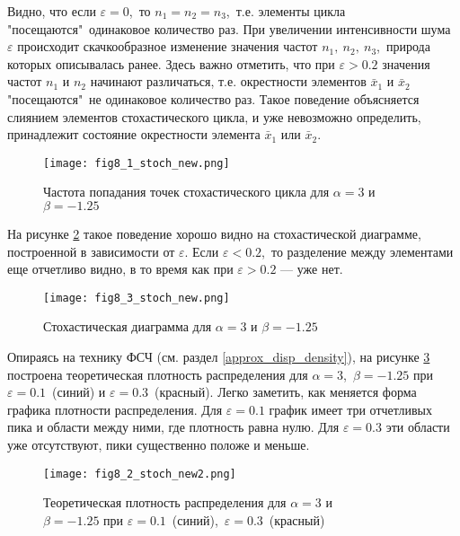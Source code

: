 \documentclass[a4paper, 14pt]{extreport}
\numberwithin{equation}{section}
\numberwithin{figure}{section}
\numberwithin{table}{section}
\begin{document}
                Видно, что если $ \varepsilon = 0 $,~то $ n_{1} = n_{2} = n_{3} $,~т.е. элементы цикла "посещаются"\ одинаковое количество раз. При увеличении интенсивности шума $ \varepsilon $ происходит скачкообразное изменение значения частот $ n_{1},~n_{2},~n_{3} $,~природа которых описывалась ранее. Здесь важно отметить, что при $ \varepsilon > 0.2 $ значения частот $ n_{1} $ и $ n_{2} $ начинают различаться, т.е. окрестности элементов $ \bar{x}_{1} $ и $ \bar{x}_{2} $ "посещаются"\ не одинаковое количество раз. Такое поведение объясняется слиянием элементов стохастического цикла, и уже невозможно определить, принадлежит состояние окрестности элемента $ \bar{x}_{1} $ или $ \bar{x}_{2} $.

				\begin{figure}[h!]
					\begin{center}
						\texttt{[image: fig8\_1\_stoch\_new.png]}
					\end{center}
					\caption{Частота попадания точек стохастического цикла для $ \alpha = 3 $ и $ \beta = -1.25 $}
					\label{fig8_1_stoch}		
				\end{figure} %

				На рисунке \ref{fig8_3_stoch} такое поведение хорошо видно на стохастической диаграмме, построенной в зависимости от $ \varepsilon $. Если $ \varepsilon < 0.2 $,~то разделение между элементами еще отчетливо видно, в то время как при $ \varepsilon > 0.2 $ --- уже нет.
				\begin{figure}[h!]
					\begin{center}
						\texttt{[image: fig8\_3\_stoch\_new.png]}
					\end{center}
					\caption{Стохастическая диаграмма для $ \alpha = 3 $ и $ \beta = -1.25 $}
					\label{fig8_3_stoch}		
				\end{figure} %

				Опираясь на технику ФСЧ (см. раздел \ref{approx_disp_density}), на рисунке \ref{fig8_2_stoch} построена теоретическая плотность распределения для $ \alpha = 3 $,~$ \beta = -1.25 $ при $ \varepsilon = 0.1 $~(синий) и $ \varepsilon = 0.3 $~(красный). Легко заметить, как меняется форма графика плотности распределения. Для $ \varepsilon = 0.1 $ график имеет три отчетливых пика и области между ними, где плотность равна нулю. Для $ \varepsilon = 0.3 $ эти области уже отсутствуют, пики существенно положе и меньше.
				\begin{figure}[h!]
					\begin{center}
						\texttt{[image: fig8\_2\_stoch\_new2.png]}
					\end{center}
					\caption{Теоретическая плотность распределения для $ \alpha = 3 $ и \\$ \beta = -1.25 $ при $ \varepsilon = 0.1 $~(синий),~$ \varepsilon = 0.3 $~(красный)}
					\label{fig8_2_stoch}		
				\end{figure} %
\end{document}
